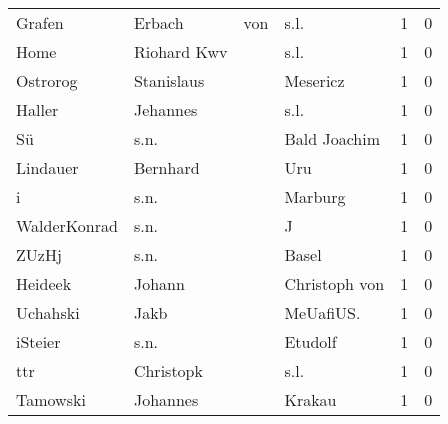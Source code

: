 \begin{center}
\begin{tiny}
\begin{longtabu}{llllrr}
                   Grafen &                             Erbach &         von &                                        s.l. &          1 &         0 \\
                     Home &                        Riohard Kwv &             &                                        s.l. &          1 &         0 \\
                 Ostrorog &                         Stanislaus &             &                                    Mesericz &          1 &         0 \\
                   Haller &                           Jehannes &             &                                        s.l. &          1 &         0 \\
                       Sü &                               s.n. &             &                                Bald Joachim &          1 &         0 \\
                 Lindauer &                           Bernhard &             &                                         Uru &          1 &         0 \\
                        i &                               s.n. &             &                                     Marburg &          1 &         0 \\
             WalderKonrad &                               s.n. &             &                                           J &          1 &         0 \\
                    ZUzHj &                               s.n. &             &                                       Basel &          1 &         0 \\
                  Heideek &                             Johann &             &                               Christoph von &          1 &         0 \\
                 Uchahski &                               Jakb &             &                                  MeUafiUS.  &          1 &         0 \\
                  iSteier &                               s.n. &             &                                     Etudolf &          1 &         0 \\
                      ttr &                          Christopk &             &                                        s.l. &          1 &         0 \\
                 Tamowski &                           Johannes &             &                                      Krakau &          1 &         0 \\

\end{longtabu}
\end{tiny}
\end{center}
